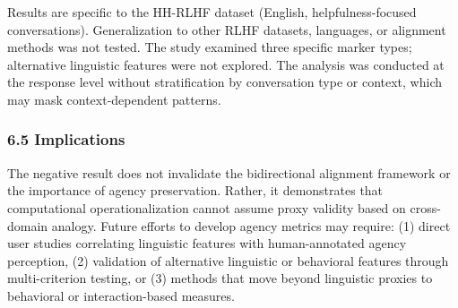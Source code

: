 Results are specific to the HH-RLHF dataset (English, helpfulness-focused conversations). Generalization to other RLHF datasets, languages, or alignment methods was not tested. The study examined three specific marker types; alternative linguistic features were not explored. The analysis was conducted at the response level without stratification by conversation type or context, which may mask context-dependent patterns.

\subsubsection{6.5 Implications}

The negative result does not invalidate the bidirectional alignment framework \citep{shen2024bidirectional} or the importance of agency preservation. Rather, it demonstrates that computational operationalization cannot assume proxy validity based on cross-domain analogy. Future efforts to develop agency metrics may require: (1) direct user studies correlating linguistic features with human-annotated agency perception, (2) validation of alternative linguistic or behavioral features through multi-criterion testing, or (3) methods that move beyond linguistic proxies to behavioral or interaction-based measures.

